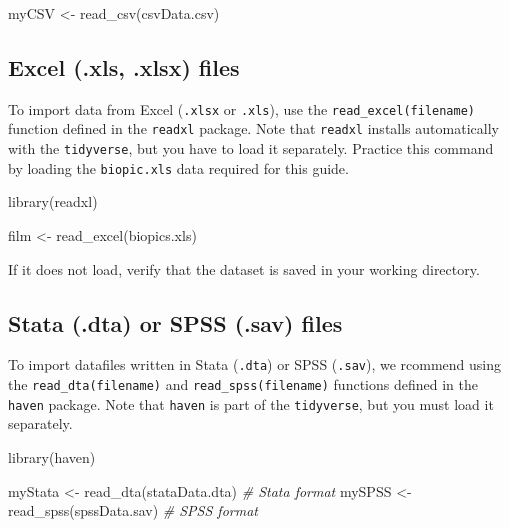 \documentclass[
  12pt,
]{krantz}
\newenvironment{Shaded}{\begin{snugshade}}{\end{snugshade}}
\newcommand{\CommentTok}[1]{\textcolor[rgb]{0.56,0.35,0.01}{\textit{#1}}}
\newcommand{\FunctionTok}[1]{\textcolor[rgb]{0.00,0.00,0.00}{#1}}
\newcommand{\NormalTok}[1]{#1}
\newcommand{\OtherTok}[1]{\textcolor[rgb]{0.56,0.35,0.01}{#1}}
\newcommand{\StringTok}[1]{\textcolor[rgb]{0.31,0.60,0.02}{#1}}
\begin{document}
\begin{Shaded}
\begin{Highlighting}[]
\NormalTok{  myCSV }\OtherTok{\textless{}{-}} \FunctionTok{read\_csv}\NormalTok{(}\StringTok{\textquotesingle{}csvData.csv\textquotesingle{}}\NormalTok{)}
\end{Highlighting}
\end{Shaded}

\hypertarget{excel-.xls-.xlsx-files}{%
\subsection{Excel (.xls, .xlsx) files}\label{excel-.xls-.xlsx-files}}

To import data from Excel (\texttt{.xlsx} or \texttt{.xls}), use the \texttt{read\_excel(\textquotesingle{}filename\textquotesingle{})} function defined in the \texttt{readxl} package. Note that \texttt{readxl} installs automatically with the \texttt{tidyverse}, but you have to load it separately. Practice this command by loading the \texttt{biopic.xls} data required for this guide.

\begin{Shaded}
\begin{Highlighting}[]
  \FunctionTok{library}\NormalTok{(readxl)}

\NormalTok{  film }\OtherTok{\textless{}{-}} \FunctionTok{read\_excel}\NormalTok{(}\StringTok{\textquotesingle{}biopics.xls\textquotesingle{}}\NormalTok{)}
\end{Highlighting}
\end{Shaded}

If it does not load, verify that the dataset is saved in your working directory.

\hypertarget{stata-.dta-or-spss-.sav-files}{%
\subsection{Stata (.dta) or SPSS (.sav) files}\label{stata-.dta-or-spss-.sav-files}}

To import datafiles written in Stata (\texttt{.dta}) or SPSS (\texttt{.sav}), we rcommend using the \texttt{read\_dta(\textquotesingle{}filename\textquotesingle{})} and \texttt{read\_spss(\textquotesingle{}filename\textquotesingle{})} functions defined in the \texttt{haven} package. Note that \texttt{haven} is part of the \texttt{tidyverse}, but you must load it separately.

\begin{Shaded}
\begin{Highlighting}[]
  \FunctionTok{library}\NormalTok{(haven)}

\NormalTok{  myStata }\OtherTok{\textless{}{-}} \FunctionTok{read\_dta}\NormalTok{(}\StringTok{\textquotesingle{}stataData.dta\textquotesingle{}}\NormalTok{) }\CommentTok{\# Stata format}
\NormalTok{  mySPSS }\OtherTok{\textless{}{-}} \FunctionTok{read\_spss}\NormalTok{(}\StringTok{\textquotesingle{}spssData.sav\textquotesingle{}}\NormalTok{) }\CommentTok{\# SPSS format}
\end{Highlighting}
\end{Shaded}
\end{document}
